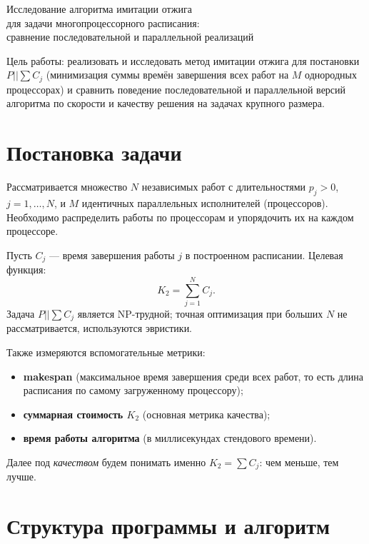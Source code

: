 \documentclass[a4paper,12pt]{article}
\begin{document}
\begin{center}
    \Large
    Исследование алгоритма имитации отжига\\
    для задачи многопроцессорного расписания:\\
    сравнение последовательной и параллельной реализаций
\end{center}

\vspace{1em}

\noindent
Цель работы: реализовать и исследовать метод имитации отжига для постановки \textbf{$P||\sum C_j$} (минимизация суммы времён завершения всех работ на $M$ однородных процессорах) и сравнить поведение последовательной и параллельной версий алгоритма по скорости и качеству решения на задачах крупного размера.


\section{Постановка задачи}

Рассматривается множество $N$ независимых работ с длительностями $p_j > 0$, $j=1,\dots,N$, и $M$ идентичных параллельных исполнителей (процессоров). Необходимо распределить работы по процессорам и упорядочить их на каждом процессоре.

Пусть $C_j$ --- время завершения работы $j$ в построенном расписании. Целевая функция:
\[
    K_2 = \sum_{j=1}^{N} C_j.
\]
Задача $P||\sum C_j$ является NP-трудной; точная оптимизация при больших $N$ не рассматривается, используются эвристики.

Также измеряются вспомогательные метрики:
\begin{itemize}
    \item \textbf{makespan} (максимальное время завершения среди всех работ, то есть длина расписания по самому загруженному процессору);
    \item \textbf{суммарная стоимость $K_2$} (основная метрика качества);
    \item \textbf{время работы алгоритма} (в миллисекундах стендового времени).
\end{itemize}

Далее под \emph{качеством} будем понимать именно $K_2 = \sum C_j$: чем меньше, тем лучше.

\section{Структура программы и алгоритм}
\end{document}
